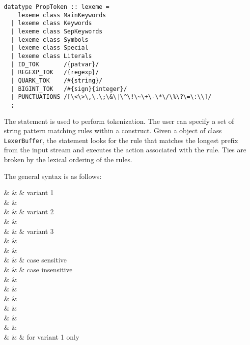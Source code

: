 \begin{verbatim}
datatype PropToken :: lexeme =
    lexeme class MainKeywords
  | lexeme class Keywords
  | lexeme class SepKeywords
  | lexeme class Symbols
  | lexeme class Special
  | lexeme class Literals
  | ID_TOK       /{patvar}/
  | REGEXP_TOK   /{regexp}/
  | QUARK_TOK    /#{string}/
  | BIGINT_TOK   /#{sign}{integer}/
  | PUNCTUATIONS /[\<\>\,\.\;\&\|\^\!\~\+\-\*\/\%\?\=\:\\]/
  ;
\end{verbatim}

\label{sec:matchscan}

The  statement is used to perform tokenization.  The user can
specify a set of string pattern matching rules within a 
construct. Given a object of class \verb|LexerBuffer|, the 
statement looks for the rule that matches the longest prefix from
the input stream and executes the action associated with the rule.
Ties are broken by the lexical ordering of the rules.  

The general syntax is as follows:
\begin{syntax}
      & \IS &   \T{(}  \T{)} 
             & variant 1 \\
      & &  \T{\{}  \T{\}} \\
      & \OR &   
            \T{(}  \T{)} & variant 2 \\
      & &   \T{\{}  \T{\}} \\
      & \OR &   \T{(}  \T{)} 
             & variant 3 \\
      & & \quad {} \\
      & &   \T{;}\\ 
 & \IS & 
             & case sensitive\\
   & \OR &  & case insensitive\\
 & \IS & \T{[}  \T{]} \\
      & \IS &  \\
      &     & \quad {}   \T{:}  \\
      & \OR &  \\
      &    &  \quad {} \T{:}  \\
 & \IS & \T{\{}  \T{\}} \\
          & \OR &  & for variant 1 only \\
\end{syntax}

